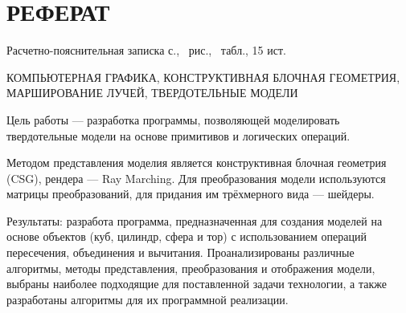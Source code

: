 \section*{РЕФЕРАТ}

Расчетно-пояснительная записка \pageref{LastPage} с., \totalfigures\ рис., \totaltables\ табл., 15 ист.

КОМПЬЮТЕРНАЯ ГРАФИКА, КОНСТРУКТИВНАЯ БЛОЧНАЯ ГЕОМЕТРИЯ, МАРШИРОВАНИЕ ЛУЧЕЙ, ТВЕРДОТЕЛЬНЫЕ МОДЕЛИ

Цель работы --- разработка программы, позволяющей моделировать твердотельные модели на основе примитивов и логических операций.

Методом представления моделия является  конструктивная  блочная геометрия  (CSG),
рендера  ---  Ray Marching.
Для  преобразования  модели  используются
матрицы преобразований, для придания им трёхмерного вида --- шейдеры.

Результаты: разработа программа, предназначенная для создания моделей на основе объектов (куб, цилиндр, сфера и тор) с использованием операций пересечения, объединения и
вычитания.
Проанализированы  различные  алгоритмы,  методы  представления,
преобразования  и  отображения  модели,  выбраны  наиболее  подходящие  для поставленной  задачи  технологии,  а  также  разработаны  алгоритмы  для  их
программной реализации.

\pagebreak